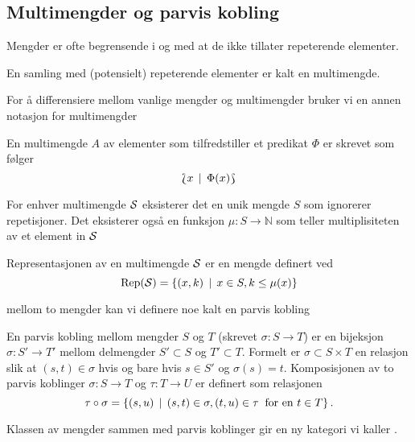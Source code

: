 \subsection{Multimengder og parvis kobling}

Mengder er ofte begrensende i og med at de ikke tillater
repeterende elementer.

\begin{definisjon}\label{def:MultMengde}
  En samling med (potensielt) repeterende elementer er
  kalt en multimengde. 
\end{definisjon}

For å differensiere mellom vanlige mengder og multimengder
bruker vi en annen notasjon for multimengder

\begin{definisjon}\label{def:Mult_Notasjon}
    En multimengde $A$ av elementer som tilfredstiller et
    predikat $\Phi$ er skrevet som følger
    \[\Lbag x\,\mid\, \Phi(x)\Rbag\]
\end{definisjon}

\begin{definisjon}\label{def:Mult_Under}
  For enhver multimengde $\mathcal{S}$ eksisterer det en unik
  mengde $S$ som ignorerer repetisjoner. Det eksisterer
  også en funksjon $\mu: S\to\mathbb{N}$ som teller
  multiplisiteten av et element in $\mathcal{S}$
\end{definisjon}

\begin{definisjon}\label{def:Rep}
   Representasjonen av en multimengde $\mathcal{S}$ er en mengde
   definert ved
   \[\textnormal{Rep}(\mathcal{S}) = \left\{(x,k)\,\mid\,x\in S, k\leq \mu(x)\right\}\]
\end{definisjon}

mellom to mengder kan vi definere noe kalt en parvis
kobling

\begin{definisjon}\label{def:Parvis-Kobling}
  En parvis kobling mellom mengder $S$ og $T$ (skrevet
  $\sigma:S\to T$) er en bijeksjon $\sigma: S'\to T'$
  mellom delmengder $S'\subset S$ og $T'\subset T$.
  Formelt er $\sigma\subset S\times T$ en relasjon slik at
  $(s,t)\in \sigma$ hvis og bare hvis $s\in S'$ og
  $\sigma(s)=t$. Komposisjonen av to parvis koblinger
  $\sigma: S\to T$ og $\tau: T\to U$ er definert som
  relasjonen
  \[\tau\circ\sigma=\left\{(s,u)\,\mid\,(s,t)\in \sigma, (t,u)\in
  \tau\;\;\text{for en $t\in T$}\right\}.\]
\end{definisjon}

Klassen av mengder sammen med parvis koblinger gir en ny
kategori vi kaller \Mch.

